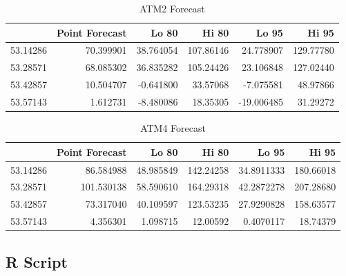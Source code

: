 \documentclass[openany]{book}
\begin{document}
\begin{table}[H]

\caption{\label{tab:unnamed-chunk-8}ATM2 Forecast}
\centering
\begin{tabular}{l|r|r|r|r|r}
\hline
\textbf{ } & \textbf{Point Forecast} & \textbf{Lo 80} & \textbf{Hi 80} & \textbf{Lo 95} & \textbf{Hi 95}\\
\hline
\rowcolor{gray!6}  53.14286 & 70.399901 & 38.764054 & 107.86146 & 24.778907 & 129.77780\\
\hline
53.28571 & 68.085302 & 36.835282 & 105.24426 & 23.106848 & 127.02440\\
\hline
\rowcolor{gray!6}  53.42857 & 10.504707 & -0.641800 & 33.57068 & -7.075581 & 48.97866\\
\hline
53.57143 & 1.612731 & -8.480086 & 18.35305 & -19.006485 & 31.29272\\
\hline
\end{tabular}
\end{table}

\begin{table}[H]

\caption{\label{tab:unnamed-chunk-8}ATM4 Forecast}
\centering
\begin{tabular}{l|r|r|r|r|r}
\hline
\textbf{ } & \textbf{Point Forecast} & \textbf{Lo 80} & \textbf{Hi 80} & \textbf{Lo 95} & \textbf{Hi 95}\\
\hline
\rowcolor{gray!6}  53.14286 & 86.584988 & 48.985849 & 142.24258 & 34.8911333 & 180.66018\\
\hline
53.28571 & 101.530138 & 58.590610 & 164.29318 & 42.2872278 & 207.28680\\
\hline
\rowcolor{gray!6}  53.42857 & 73.317040 & 40.109597 & 123.53235 & 27.9290828 & 158.63577\\
\hline
53.57143 & 4.356301 & 1.098715 & 12.00592 & 0.4070117 & 18.74379\\
\hline
\end{tabular}
\end{table}

\hypertarget{Part-A-RScript}{%
\subsection*{R Script}\label{Part-A-RScript}}
\end{document}

